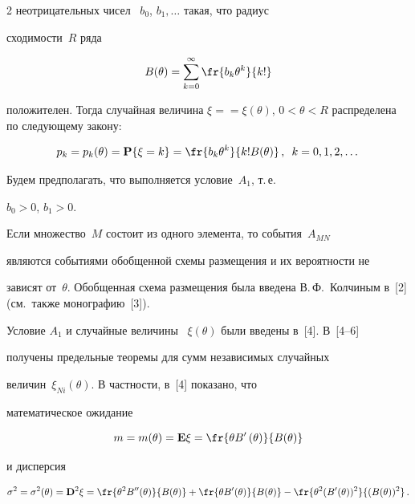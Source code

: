 \begin{multicols}{2}
неотрицательных чисел~ $b_0$, $b_1, \dots$ такая, что радиус


сходимости~$R$ ряда


$$ 


B(\theta)=\sum_{k=0}^{\infty}\fr{b_k\theta^k}{k!}


$$


положителен. Тогда  случайная величина $\xi=$\linebreak $=\xi(\theta)$, $


0<\theta<R$ распределена по следующему закону:


$$


p_k=p_k(\theta)={\mathbf


P}\{\xi=k\}=\fr{b_k\theta^k}{k!B(\theta)}\,,\enskip k=0,1,2,\dots


$$


Будем  предполагать, что выполняется условие~$A_1$, т.\,е.\


 $b_0>0$, $b_1>0$.





Если множество~$M$ состоит из одного элемента, то события~$A_{MN}$


являются событиями обобщенной схемы размещения и их вероятности не


зависят от~$\theta$. Обобщенная схема размещения была введена В.\,Ф.~Колчиным в~[2] (см.\ также монографию~[3]).





 Условие $A_1$ и случайные величины~ $\xi(\theta)$ были введены в~[4]. В~[4--6] 


 получены предельные теоремы для сумм независимых случайных


величин~$\xi_{Ni}(\theta)$. В частности, в~[4] показано, что


математическое ожидание


$$


m=m(\theta)=  {\E}\xi=  \fr{\theta B'\left(\theta\right)}{B(\theta)}


$$


и дисперсия


$$


 \sigma^2=\sigma^2(\theta)=  {\DDD}^2\xi=


\fr{\theta^2 B^{\prime\prime} (\theta)}{B(\theta)}+ \fr{\theta


B'(\theta)}{B(\theta)}- \fr{\theta^2


(B'(\theta))^2}{(B(\theta))^2}\,.


$$



\end{multicols}
